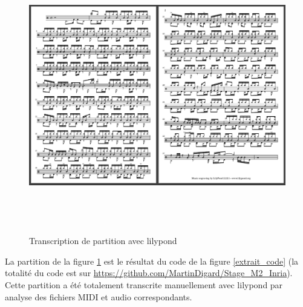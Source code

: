 \begin{figure}[h]
    \includegraphics[height=120mm, width=160mm]{
    z_images/4_experimentations/1_analyses/3_partition.png}
    \caption{Transcription de partition avec lilypond}
	\label{partition_ref}
\end{figure}

La partition de la figure \ref{partition_ref} est le résultat du code de la
figure \ref{extrait_code} (la totalité du code est sur
\url{https://github.com/MartinDigard/Stage_M2_Inria}). Cette partition a été totalement transcrite
manuellement avec lilypond par analyse des fichiers MIDI et audio
correspondants.

